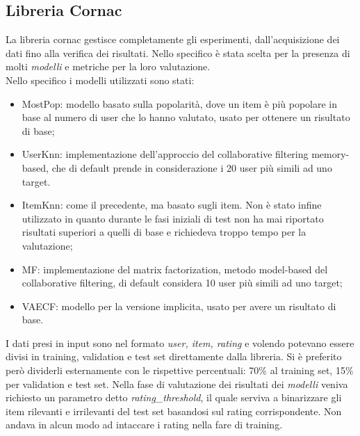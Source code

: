 \subsection{Libreria Cornac}
La libreria cornac gestisce completamente gli esperimenti, dall'acquisizione dei dati fino alla verifica dei risultati.
Nello specifico è stata scelta per la presenza di molti \textit{modelli} e metriche per la loro valutazione.\\
Nello specifico i modelli utilizzati sono stati:
\begin{itemize}
    \item MostPop: modello basato sulla popolarità, dove un item è più popolare in base al numero di user che lo hanno valutato, usato per ottenere un risultato di base;
    \item UserKnn: implementazione dell'approccio del collaborative filtering memory-based, che di default prende in considerazione i 20 user più simili ad uno target.
    \item ItemKnn: come il precedente, ma basato sugli item. Non è stato infine utilizzato in quanto durante le fasi iniziali di test non ha mai riportato risultati superiori a quelli di base e richiedeva troppo tempo per la valutazione;
    \item MF: implementazione del matrix factorization, metodo model-based del collaborative filtering, di default considera 10 user più simili ad uno target;
    \item VAECF: modello per la versione implicita, usato per avere un risultato di base.
\end{itemize}
I dati presi in input sono nel formato \textit{user, item, rating} e volendo potevano essere divisi in training, validation e test set direttamente dalla libreria.
Si è preferito però dividerli esternamente con le rispettive percentuali: 70\% al training set, 15\% per validation e test set.
Nella fase di valutazione dei risultati dei \textit{modelli} veniva richiesto un parametro detto \textit{rating\_threshold}, il quale serviva a binarizzare gli item rilevanti e irrilevanti del test set basandosi sul rating corrispondente. Non andava in alcun modo ad intaccare i rating nella fare di training.
 
